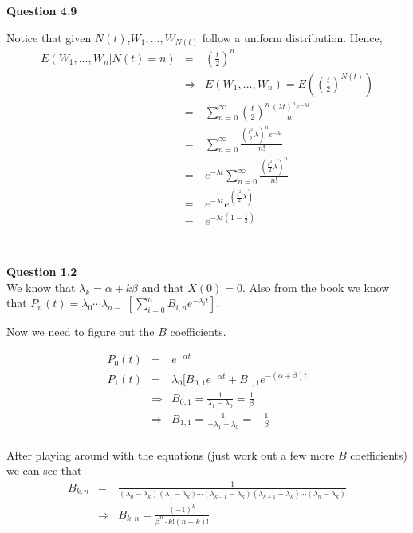 \documentclass[10pt,a4paper]{article}
\begin{document}
\begin{flushleft}

\begin{eqnarray*}
\\
\end{eqnarray*}


\textbf{Question 4.9}

Notice that given $N(t)$,$W_1,\ldots,W_{N(t)}$ follow a uniform
distribution. Hence,
\begin{eqnarray*}
E(W_1,\ldots,W_n|N(t)=n)&=&(\frac{t}{2})^n\\
&\Rightarrow& E(W_1,\ldots,W_n)=E((\frac{t}{2})^{N(t)})\\
&=&\sum_{n=0}^\infty (\frac{t}{2})^n \frac{(\lambda t)^n
e^{-\lambda
t}}{n!}\\
&=&\sum_{n=0}^\infty \frac{(\frac{t^2}{2} \lambda )^n
e^{-\lambda t}}{n!}\\
&=&e^{-\lambda t} \sum_{n=0}^\infty \frac{(\frac{t^2}{2} \lambda
)^n}{n!}\\
&=&e^{-\lambda t} e^{(\frac{t^2}{2} \lambda)}\\
&=&e^{-\lambda t (1- \frac{t}{2})}\\
\end{eqnarray*}

\begin{eqnarray*}
\\
\end{eqnarray*}



\textbf{Question 1.2}\\

We know that $\lambda_k=\alpha+k\beta$ and that $X(0)=0$. Also
from the book we know that $P_n(t) = \lambda_0 \cdots
\lambda_{n-1} [\sum_{i=0}^{n} B_{i,n} e^{-\lambda_i t}]$.

Now we need to figure out the $B$ coefficients.

\begin{eqnarray*}
P_0(t)&=&e^{-\alpha t}\\
P_1(t) &=& \lambda_0 [B_{0,1} e^{-\alpha t} + B_{1,1}
e^{-(\alpha+\beta) t}\\
&\Rightarrow&
B_{0,1}=\frac{1}{\lambda_1-\lambda_0}=\frac{1}{\beta}\\
&\Rightarrow&
B_{1,1}=\frac{1}{-\lambda_1+\lambda_0}=-\frac{1}{\beta}\\
\end{eqnarray*}

After playing around with the equations (just work out a few more
$B$ coefficients) we can see that
\begin{eqnarray*}
B_{k,n}&=&\frac{1}{(\lambda_0-\lambda_k)(\lambda_1-\lambda_k)
\cdots (\lambda_{k-1}-\lambda_k)(\lambda_{k+1}-\lambda_k) \cdots
(\lambda_{n}-\lambda_k)}\\
&\Rightarrow& B_{k,n} = \frac{(-1)^k}{\beta^n \cdot k!(n-k)!}
\end{eqnarray*}


\end{flushleft}
\end{document}
